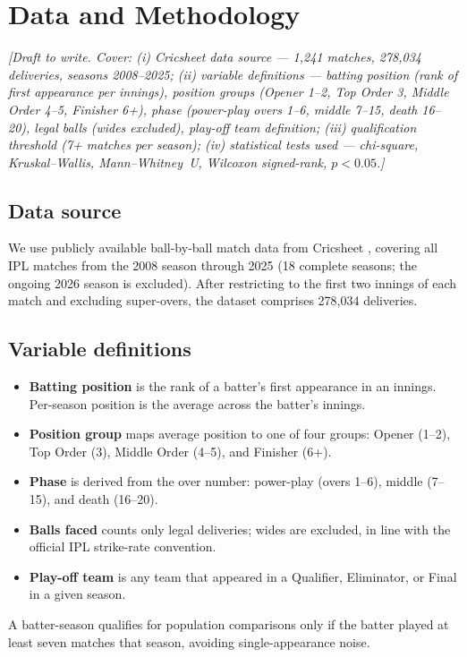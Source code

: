 \documentclass[11pt]{article}
\newcommand{\authornote}[1]{{\color{red}\textit{[#1]}}}
\begin{document}
\section{Data and Methodology}
\label{sec:methods}

\authornote{Draft to write. Cover: (i) Cricsheet data source ---
1{,}241 matches, 278{,}034 deliveries, seasons 2008--2025;
(ii) variable definitions --- batting position (rank of first appearance per
innings), position groups (Opener 1--2, Top Order 3, Middle Order 4--5,
Finisher 6+), phase (power-play overs 1--6, middle 7--15, death 16--20),
legal balls (wides excluded), play-off team definition;
(iii) qualification threshold (7+ matches per season);
(iv) statistical tests used --- chi-square, Kruskal--Wallis, Mann--Whitney~U,
Wilcoxon signed-rank, $p<0.05$.}

\subsection*{Data source}
We use publicly available ball-by-ball match data from Cricsheet \citep{cricsheet},
covering all IPL matches from the 2008 season through 2025 (18 complete seasons;
the ongoing 2026 season is excluded). After restricting to the first two innings of
each match and excluding super-overs, the dataset comprises 278{,}034 deliveries.

\subsection*{Variable definitions}
\begin{itemize}
  \item \textbf{Batting position} is the rank of a batter's first appearance in an
        innings. Per-season position is the average across the batter's innings.
  \item \textbf{Position group} maps average position to one of four groups:
        Opener (1--2), Top Order (3), Middle Order (4--5), and Finisher (6+).
  \item \textbf{Phase} is derived from the over number: power-play (overs 1--6),
        middle (7--15), and death (16--20).
  \item \textbf{Balls faced} counts only legal deliveries; wides are excluded, in
        line with the official IPL strike-rate convention.
  \item \textbf{Play-off team} is any team that appeared in a Qualifier, Eliminator,
        or Final in a given season.
\end{itemize}
A batter-season qualifies for population comparisons only if the batter played at
least seven matches that season, avoiding single-appearance noise.
\end{document}
